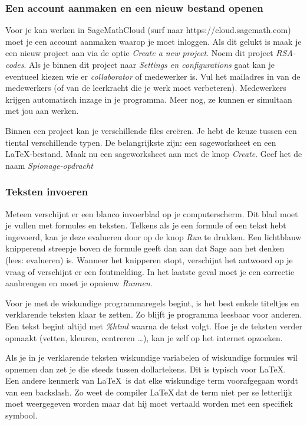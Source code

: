 \subsubsection*{Een account aanmaken en een nieuw bestand openen}

Voor je kan werken in SageMathCloud (surf naar https://cloud.sagemath.com) moet je een account aanmaken waarop je moet inloggen. Als dit gelukt is maak je een nieuw project aan via de optie \emph{Create a new project}. Noem dit project \emph{RSA-codes}. Als je binnen dit project naar \emph{Settings en configurations} gaat kan je eventueel kiezen wie er \emph{collaborator} of medewerker is. Vul het mailadres in van de medewerkers (of van de leerkracht die je werk moet verbeteren). Medewerkers krijgen automatisch inzage in je programma. Meer nog, ze kunnen er simultaan met jou aan werken. 

Binnen een project kan je verschillende files creëren. Je hebt de keuze tussen een tiental verschillende typen. De belangrijkste zijn: een sageworksheet en een \LaTeX -bestand. Maak nu een sageworksheet aan met de knop \emph{Create}. Geef het de naam \emph{Spionage-opdracht}

\subsubsection*{Teksten invoeren}

Meteen verschijnt er een blanco invoerblad op je computerscherm. Dit blad moet je vullen met formules en teksten. Telkens als je een formule of een tekst hebt ingevoerd, kan je deze evalueren door op de knop \emph{Run} te drukken. Een lichtblauw knipperend streepje boven de formule geeft dan aan dat Sage aan het denken (lees: evalueren) is. Wanneer het knipperen stopt, verschijnt het antwoord op je vraag of verschijnt er een foutmelding. In het laatste geval moet je een correctie aanbrengen en moet je opnieuw \emph{Runnen}.

Voor je met de wiskundige programmaregels begint, is het best enkele titeltjes en verklarende teksten klaar te zetten. Zo blijft je programma leesbaar voor anderen. Een tekst begint altijd met  \emph{\%html} waarna de tekst volgt. Hoe je de teksten verder opmaakt (vetten, kleuren, centreren \dots), kan je zelf op het internet opzoeken. 

Als je in je verklarende teksten wiskundige variabelen of wiskundige formules wil opnemen dan zet je die steeds tussen dollartekens. Dit is typisch voor \LaTeX. Een andere kenmerk van \LaTeX \, is dat elke wiskundige term voorafgegaan wordt van een backslash. Zo weet de compiler \LaTeX \,dat de term niet per se letterlijk moet weergegeven worden maar dat hij moet vertaald worden met een specifiek symbool.


